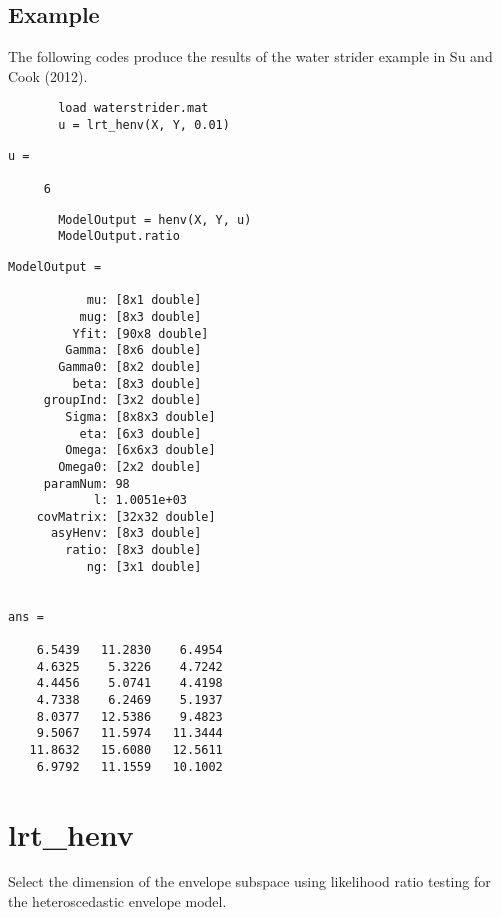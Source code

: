 \documentclass[a4paper,11pt,openany]{memoir}
\begin{document}
\subsection*{Example}

\begin{par}
The following codes produce the results of the water strider example in Su and Cook (2012).
\end{par} \vspace{1em}

\begin{verbatim}       load waterstrider.mat
       u = lrt_henv(X, Y, 0.01)
       \end{verbatim}
               \color{lightgray}\ttfamily \begin{verbatim}
u =

     6
\end{verbatim} \rmfamily
\color{black}
\begin{verbatim}       ModelOutput = henv(X, Y, u)
       ModelOutput.ratio\end{verbatim}

 \color{lightgray}\ttfamily \begin{verbatim}
ModelOutput = 

           mu: [8x1 double]
          mug: [8x3 double]
         Yfit: [90x8 double]
        Gamma: [8x6 double]
       Gamma0: [8x2 double]
         beta: [8x3 double]
     groupInd: [3x2 double]
        Sigma: [8x8x3 double]
          eta: [6x3 double]
        Omega: [6x6x3 double]
       Omega0: [2x2 double]
     paramNum: 98
            l: 1.0051e+03
    covMatrix: [32x32 double]
      asyHenv: [8x3 double]
        ratio: [8x3 double]
           ng: [3x1 double]


ans =

    6.5439   11.2830    6.4954
    4.6325    5.3226    4.7242
    4.4456    5.0741    4.4198
    4.7338    6.2469    5.1937
    8.0377   12.5386    9.4823
    9.5067   11.5974   11.3444
   11.8632   15.6080   12.5611
    6.9792   11.1559   10.1002

\end{verbatim} \rmfamily
\color{black}
    
\newpage
    
\rmfamily
\color{black}\section{lrt\_henv}

\begin{par}
Select the dimension of the envelope subspace using likelihood ratio testing for the heteroscedastic envelope model.
\end{par} \vspace{1em}
\end{document}
